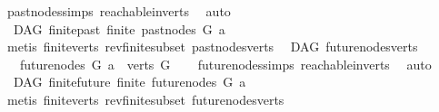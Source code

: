 \begin{isabellebody}
%
\isatagproof
{}\isamarkupfalse%
\ past{\isacharunderscore}{\kern0pt}nodes{\isachardot}{\kern0pt}simps\ reachable{\isacharunderscore}{\kern0pt}in{\isacharunderscore}{\kern0pt}verts\ \isamarkupfalse%
\ auto%
\endisatagproof
{\isafoldproof}%
%
\isadelimproof
\isanewline
%
\endisadelimproof
\isanewline
{}\isamarkupfalse%
\ {\isacharparenleft}{\kern0pt}\ DAG{\isacharparenright}{\kern0pt}\ finite{\isacharunderscore}{\kern0pt}past{\isacharcolon}{\kern0pt}\ {\isachardoublequoteopen}finite\ {\isacharparenleft}{\kern0pt}past{\isacharunderscore}{\kern0pt}nodes\ G\ a{\isacharparenright}{\kern0pt}{\isachardoublequoteclose}\isanewline
%
\isadelimproof
\ \ %
\endisadelimproof
%
\isatagproof
{}\isamarkupfalse%
\ {\isacharparenleft}{\kern0pt}metis\ finite{\isacharunderscore}{\kern0pt}verts\ rev{\isacharunderscore}{\kern0pt}finite{\isacharunderscore}{\kern0pt}subset\ past{\isacharunderscore}{\kern0pt}nodes{\isacharunderscore}{\kern0pt}verts{\isacharparenright}{\kern0pt}%
\endisatagproof
{\isafoldproof}%
%
\isadelimproof
\isanewline
%
\endisadelimproof
\isanewline
{}\isamarkupfalse%
\ {\isacharparenleft}{\kern0pt}\ DAG{\isacharparenright}{\kern0pt}\ future{\isacharunderscore}{\kern0pt}nodes{\isacharunderscore}{\kern0pt}verts{\isacharcolon}{\kern0pt}\ \isanewline
\ \ \ {\isachardoublequoteopen}future{\isacharunderscore}{\kern0pt}nodes\ G\ a\ {\isasymsubseteq}\ verts\ G{\isachardoublequoteclose}\isanewline
%
\isadelimproof
\ \ %
\endisadelimproof
%
\isatagproof
{}\isamarkupfalse%
\ future{\isacharunderscore}{\kern0pt}nodes{\isachardot}{\kern0pt}simps\ reachable{}{\isacharunderscore}{\kern0pt}in{\isacharunderscore}{\kern0pt}verts\ \isamarkupfalse%
\ auto%
\endisatagproof
{\isafoldproof}%
%
\isadelimproof
\isanewline
%
\endisadelimproof
\isanewline
{}\isamarkupfalse%
\ {\isacharparenleft}{\kern0pt}\ DAG{\isacharparenright}{\kern0pt}\ finite{\isacharunderscore}{\kern0pt}future{\isacharcolon}{\kern0pt}\ {\isachardoublequoteopen}finite\ {\isacharparenleft}{\kern0pt}future{\isacharunderscore}{\kern0pt}nodes\ G\ a{\isacharparenright}{\kern0pt}{\isachardoublequoteclose}\isanewline
%
\isadelimproof
\ \ %
\endisadelimproof
%
\isatagproof
{}\isamarkupfalse%
\ {\isacharparenleft}{\kern0pt}metis\ finite{\isacharunderscore}{\kern0pt}verts\ rev{\isacharunderscore}{\kern0pt}finite{\isacharunderscore}{\kern0pt}subset\ future{\isacharunderscore}{\kern0pt}nodes{\isacharunderscore}{\kern0pt}verts{\isacharparenright}{\kern0pt}%

\end{isabellebody}
